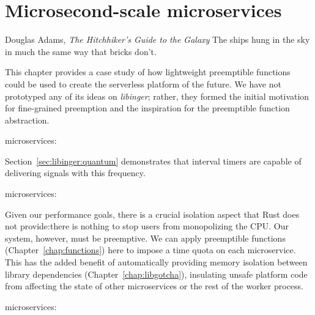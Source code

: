 \chapter{Microsecond-scale microservices}
\label{chap:microservices}

\ifdefined\chapquotes
\begin{chapquote}{Douglas Adams, \textit{The Hitchhiker's Guide to the Galaxy}}
The ships hung in the sky in much the same way that bricks don't.
\end{chapquote}
\fi

This chapter provides a case study of how lightweight preemptible functions could be
used to create the serverless platform of the future.  We have not prototyped any of
its ideas on \textit{libinger}; rather, they formed the initial motivation for
fine-grained preemption and the inspiration for the preemptible function abstraction.


\begin{namespacereferences}{microservices:}







\end{namespacereferences}
\hspace{-2em}
Section~\ref{sec:libinger:quantum} demonstrates that interval timers are capable of
delivering signals with this frequency.


\begin{namespacereferences}{microservices:}

\end{namespacereferences}

Given our performance goals, there is a crucial isolation aspect that Rust does not
provide:\@ there is nothing to stop users from monopolizing the CPU.  Our system,
however, must be preemptive.  We can apply preemptible functions
(Chapter~\ref{chap:functions}) here to impose a time quota on each microservice.
This has the added benefit of automatically providing memory isolation between
library dependencies (Chapter~\ref{chap:libgotcha}), insulating unsafe platform code
from affecting the state of other microservices or the rest of the worker process.

\begin{namespacereferences}{microservices:}











\end{namespacereferences}
